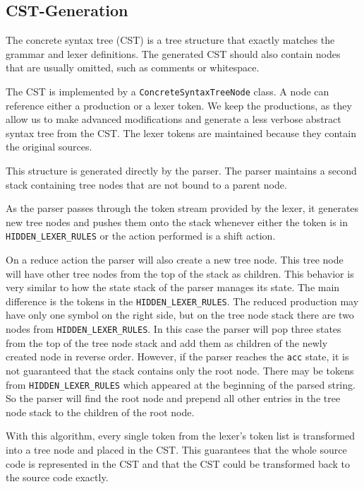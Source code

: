 \subsection{CST-Generation}
The concrete syntax tree (CST) is a tree structure that exactly matches the grammar and lexer definitions. 
The generated CST should also contain nodes that are usually omitted, such as comments or whitespace.

The CST is implemented by a \verb|ConcreteSyntaxTreeNode| class. 
A node can reference either a production or a lexer token. 
We keep the productions, as they allow us to make advanced modifications and generate a less verbose abstract syntax tree from the CST. 
The lexer tokens are maintained because they contain the original sources.

This structure is generated directly by the parser. 
The parser maintains a second stack containing tree nodes that are not bound to a parent node.

As the parser passes through the token stream provided by the lexer, 
it generates new tree nodes and pushes them onto the stack whenever either the token is in \verb|HIDDEN_LEXER_RULES| or the action performed is a shift action. 

On a reduce action the parser will also create a new tree node. 
This tree node will have other tree nodes from the top of the stack as children. 
This behavior is very similar to how the state stack of the parser manages its state. 
The main difference is the tokens in the \verb|HIDDEN_LEXER_RULES|. 
The reduced production may have only one symbol on the right side, but on the tree node stack there are two nodes from \verb|HIDDEN_LEXER_RULES|. 
In this case the parser will pop three states from the top of the tree node stack and add them as children of the newly created node in reverse order. 
However, if the parser reaches the \verb|acc| state, it is not guaranteed that the stack contains only the root node. 
There may be tokens from \verb|HIDDEN_LEXER_RULES| which appeared at the beginning of the parsed string. 
So the parser will find the root node and prepend all other entries in the tree node stack to the children of the root node. 

With this algorithm, every single token from the lexer's token list is transformed into a tree node and placed in the CST. 
This guarantees that the whole source code is represented in the CST and that the CST could be transformed back to the source code exactly.

